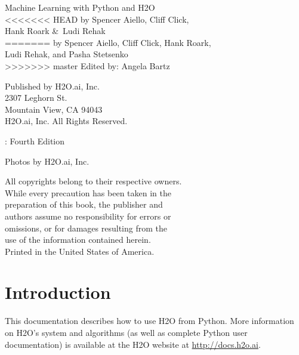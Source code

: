 \newpage
\restoregeometry

\null\vfill %

\thispagestyle{empty}%

{\raggedright 

Machine Learning with Python and H2O\\
<<<<<<< HEAD
  by Spencer Aiello, Cliff Click, \\ Hank Roark \&\  Ludi Rehak\\
=======
  by Spencer Aiello, Cliff Click, Hank Roark, \\ Ludi Rehak, and Pasha Stetsenko \\
>>>>>>> master
Edited by: Angela Bartz
\bigskip

Published by H2O.ai, Inc. \\
2307 Leghorn St. \\
Mountain View, CA 94043\\
\bigskip
\textcopyright \the\year \hspace{1pt} H2O.ai, Inc. All Rights Reserved. 
\bigskip

\monthname \hspace{1pt}  \the\year: Fourth Edition
\bigskip

Photos by \textcopyright H2O.ai, Inc.
\bigskip

All copyrights belong to their respective owners.\\
While every precaution has been taken in the\\
preparation of this book, the publisher and\\
authors assume no responsibility for errors or\\
omissions, or for damages resulting from the\\
use of the information contained herein.\\
\bigskip
Printed in the United States of America. 
}


\newpage
\thispagestyle{empty}%

\tableofcontents
\thispagestyle{empty}%

\newpage

\section{Introduction}

This documentation describes how to use H2O from Python. More information on H2O's system and algorithms
(as well as complete Python user documentation) is available at the H2O website at {\url{http://docs.h2o.ai}}.

